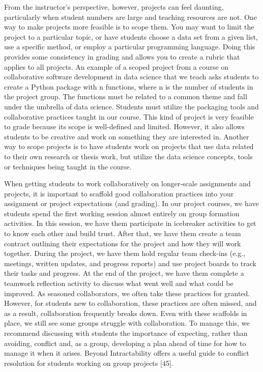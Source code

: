 \documentclass[
  10pt,
  letterpaper,
]{article}
\begin{document}
From the instructor's perspective, however, projects can feel daunting,
particularly when student numbers are large and teaching resources are
not. One way to make projects more feasible is to scope them. You may
want to limit the project to a particular topic, or have students choose
a data set from a given list, use a specific method, or employ a
particular programming language. Doing this provides some consistency in
grading and allows you to create a rubric that applies to all projects.
An example of a scoped project from a course on collaborative software
development in data science that we teach asks students to create a
Python package with n functions, where n is the number of students in
the project group. The functions must be related to a common theme and
fall under the umbrella of data science. Students must utilize the
packaging tools and collaborative practices taught in our course. This
kind of project is very feasible to grade because its scope is
well-defined and limited. However, it also allows students to be
creative and work on something they are interested in. Another way to
scope projects is to have students work on projects that use data
related to their own research or thesis work, but utilize the data
science concepts, tools or techniques being taught in the course.

When getting students to work collaboratively on longer-scale
assignments and projects, it is important to scaffold good collaboration
practices into your assignment or project expectations (and grading). In
our project courses, we have students spend the first working session
almost entirely on group formation activities. In this session, we have
them participate in icebreaker activities to get to know each other and
build trust. After that, we have them create a team contract outlining
their expectations for the project and how they will work together.
During the project, we have them hold regular team check-ins (e.g.,
meetings, written updates, and progress reports) and use project boards
to track their tasks and progress. At the end of the project, we have
them complete a teamwork reflection activity to discuss what went well
and what could be improved. As seasoned collaborators, we often take
these practices for granted. However, for students new to collaboration,
these practices are often missed, and as a result, collaboration
frequently breaks down. Even with these scaffolds in place, we still see
some groups struggle with collaboration. To manage this, we recommend
discussing with students the importance of expecting, rather than
avoiding, conflict and, as a group, developing a plan ahead of time for
how to manage it when it arises. Beyond Intractability offers a useful
guide to conflict resolution for students working on group projects
{[}45{]}.
\end{document}
